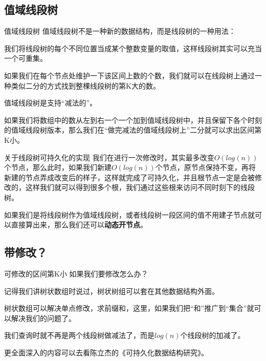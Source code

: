\documentclass{beamer}
\begin{document}
		\subsection{值域线段树}
		\begin{frame}{值域线段树}
			值域线段树不是一种新的数据结构，而是线段树的一种用法：
			
			我们将线段树的每个不同位置当成某个整数变量的取值，这样线段树其实可以充当一个可重集。
			
			如果我们在每个节点处维护一下该区间上数的个数，我们就可以在线段树上通过一种类似二分的方式找到整棵线段树的第K大的数。
			
			值域线段树是支持“减法的”。
			
			如果我们将数组中的数从左到右一个一个加到值域线段树中，并且保留下各个时刻的值域线段树版本，那么我们在“做完减法的值域线段树上”二分就可以求出区间第K小。
		\end{frame} 
		\begin{frame}{关于线段树可持久化的实现}
			我们在进行一次修改时，其实最多改变$O(log(n))$个节点，那么此时，如果我们新建$O(log(n))$个节点，原节点保持不变，再将新建的节点弄成改变后的样子，这样就完成了可持久化，并且根节点一定是会被修改的，这样我们就可以得到很多个根，我们通过这些根来访问不同时刻下的线段树。
			
			如果我们是将线段树作为值域线段树，或者线段树一段区间的值不用建子节点就可以直接算出来，那么我们还可以\textbf{动态开节点}。
		\end{frame} 
		\subsection{带修改？}
		\begin{frame}{可修改的区间第K小}
			如果我们要修改怎么办？
			
			记得我们讲树状数组时说过，树状树组可以套在其他数据结构外面。
			
			树状数组可以解决单点修改，求前缀和，这里，如果我们把“和”推广到“集合”就可以解决我们的问题了。
			
			我们查询时就不再是两个线段树做减法了，而是$log(n)$个线段树的加减了。
			
			更全面深入的内容可以去看陈立杰的《可持久化数据结构研究》。
		\end{frame} 
\end{document}
